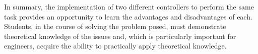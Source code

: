 \documentclass[conference]{IEEEtran}
\begin{document}
In summary, the implementation of two different controllers to perform the same task provides an opportunity to learn the advantages and disadvantages of each. Students, in the course of solving the problem posed, must demonstrate theoretical knowledge of the issues and, which is particularly important for engineers, acquire the ability to practically apply theoretical knowledge. 




\end{document}
